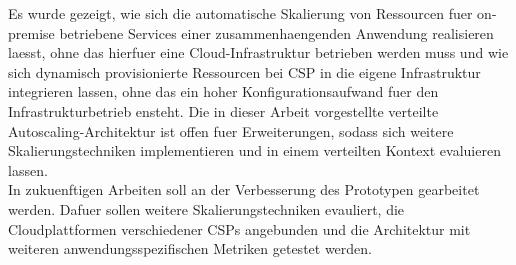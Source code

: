 \documentclass[runningheads]{llncs}
\begin{document}
Es wurde gezeigt, wie sich die automatische Skalierung von Ressourcen fuer on-premise betriebene Services einer zusammenhaengenden Anwendung realisieren laesst, ohne das hierfuer eine Cloud-Infrastruktur betrieben werden muss und wie sich dynamisch provisionierte Ressourcen bei CSP in die eigene Infrastruktur integrieren lassen, ohne das ein hoher Konfigurationsaufwand fuer den Infrastrukturbetrieb ensteht. Die in dieser Arbeit vorgestellte verteilte Autoscaling-Architektur ist offen fuer Erweiterungen, sodass sich weitere Skalierungstechniken implementieren und in einem verteilten Kontext evaluieren lassen. \\

In zukuenftigen Arbeiten soll an der Verbesserung des Prototypen gearbeitet werden. Dafuer sollen weitere Skalierungstechniken evauliert, die Cloudplattformen verschiedener CSPs angebunden und die Architektur mit weiteren anwendungsspezifischen Metriken getestet werden.
	
%
%
\newpage


%
\end{document}
